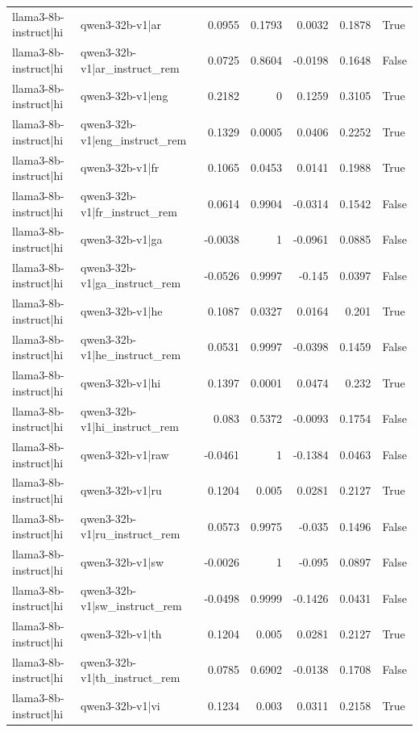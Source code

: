 \begin{table}
\begin{tabular}{l l r r r r l}
llama3-8b-instruct|hi & qwen3-32b-v1|ar & 0.0955 & 0.1793 & 0.0032 & 0.1878 & True \\
llama3-8b-instruct|hi & qwen3-32b-v1|ar_instruct_rem & 0.0725 & 0.8604 & -0.0198 & 0.1648 & False \\
llama3-8b-instruct|hi & qwen3-32b-v1|eng & 0.2182 & 0 & 0.1259 & 0.3105 & True \\
llama3-8b-instruct|hi & qwen3-32b-v1|eng_instruct_rem & 0.1329 & 0.0005 & 0.0406 & 0.2252 & True \\
llama3-8b-instruct|hi & qwen3-32b-v1|fr & 0.1065 & 0.0453 & 0.0141 & 0.1988 & True \\
llama3-8b-instruct|hi & qwen3-32b-v1|fr_instruct_rem & 0.0614 & 0.9904 & -0.0314 & 0.1542 & False \\
llama3-8b-instruct|hi & qwen3-32b-v1|ga & -0.0038 & 1 & -0.0961 & 0.0885 & False \\
llama3-8b-instruct|hi & qwen3-32b-v1|ga_instruct_rem & -0.0526 & 0.9997 & -0.145 & 0.0397 & False \\
llama3-8b-instruct|hi & qwen3-32b-v1|he & 0.1087 & 0.0327 & 0.0164 & 0.201 & True \\
llama3-8b-instruct|hi & qwen3-32b-v1|he_instruct_rem & 0.0531 & 0.9997 & -0.0398 & 0.1459 & False \\
llama3-8b-instruct|hi & qwen3-32b-v1|hi & 0.1397 & 0.0001 & 0.0474 & 0.232 & True \\
llama3-8b-instruct|hi & qwen3-32b-v1|hi_instruct_rem & 0.083 & 0.5372 & -0.0093 & 0.1754 & False \\
llama3-8b-instruct|hi & qwen3-32b-v1|raw & -0.0461 & 1 & -0.1384 & 0.0463 & False \\
llama3-8b-instruct|hi & qwen3-32b-v1|ru & 0.1204 & 0.005 & 0.0281 & 0.2127 & True \\
llama3-8b-instruct|hi & qwen3-32b-v1|ru_instruct_rem & 0.0573 & 0.9975 & -0.035 & 0.1496 & False \\
llama3-8b-instruct|hi & qwen3-32b-v1|sw & -0.0026 & 1 & -0.095 & 0.0897 & False \\
llama3-8b-instruct|hi & qwen3-32b-v1|sw_instruct_rem & -0.0498 & 0.9999 & -0.1426 & 0.0431 & False \\
llama3-8b-instruct|hi & qwen3-32b-v1|th & 0.1204 & 0.005 & 0.0281 & 0.2127 & True \\
llama3-8b-instruct|hi & qwen3-32b-v1|th_instruct_rem & 0.0785 & 0.6902 & -0.0138 & 0.1708 & False \\
llama3-8b-instruct|hi & qwen3-32b-v1|vi & 0.1234 & 0.003 & 0.0311 & 0.2158 & True \\

\end{tabular}
\end{table}
